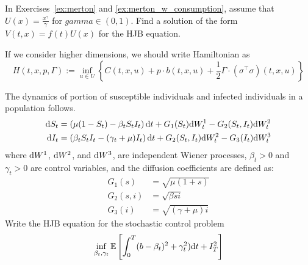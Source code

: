 \documentclass[11pt]{book}
\newcommand{\dd}{\text{\normalfont d}}
\newcommand{\dt}{\text{\normalfont d}t}
\newcommand{\dW}{\text{\normalfont d}W}
\begin{document}
\begin{ex}
    In Exercises~\ref{ex:merton} and \ref{ex:merton_w_consumption}, assume that $U(x)=\frac{x^\gamma}{\gamma}$ for $gamma\in(0,1)$. Find a solution of the form $V(t,x)=f(t)U(x)$ for the HJB equation.
\end{ex}

If we consider higher dimensions, we should write Hamiltonian as  
\begin{equation}
H(t,x,p,\Gamma):=\inf_{u\in U}\left\{ C(t,x,u)  + p\cdot b(t,x,u)+\frac12 \Gamma\cdot(\sigma^{\top}\sigma)(t,x,u)\right\}
\end{equation}
\begin{ex}
The dynamics of portion of susceptible individuals and infected individuals in a population follows.
\begin{align*}
\dd{S}_t &= \left( \mu(1 - S_t) - \beta_t S_t I_t \right) \dt + G_1(S_t) \dW_t^{1}- G_2(S_t,I_t) \dW_t^{2} \\
\dd{I}_t &= \left( \beta_t S_t I_t - (\gamma_t + \mu)I_t \right) \dt + G_2(S_t,I_t)  \dW_t^{2} - G_3(I_t)  \dW_t^{3}
\end{align*}
where $\dW^1$, $\dW^2$, and $\dW^3$,  are independent Wiener processes, $\beta_t>0$ and $\gamma_t>0$ are control variables, and the diffusion coefficients are defined as:
\begin{align*}
G_1(s) &= \sqrt{\mu(1 + s)} \\
G_2(s,i) &= \sqrt{\beta s i} \\
G_3(i) &= \sqrt{(\gamma + \mu)i}
\end{align*}
Write the HJB equation for the stochastic control problem
\[
\inf_{\beta_t,\gamma_t}\mathbb{E}\left[\int_0^T (b-\beta_t)^2+\gamma_t^2 )\dt + I_T^2\right]
\]
\end{ex}
\end{document}
